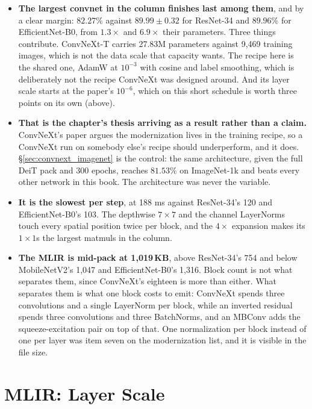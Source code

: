 \begin{itemize}
  \item \textbf{The largest convnet in the column finishes last among
    them}, and by a clear margin: $82.27\%$ against $89.99 \pm 0.32$ for
    ResNet-34 and $89.96\%$ for EfficientNet-B0, from $1.3\times$ and
    $6.9\times$ their parameters. Three things contribute. ConvNeXt-T
    carries 27.83M parameters against 9,469 training images, which is not
    the data scale that capacity wants. The recipe here is the shared one,
    AdamW at $10^{-3}$ with cosine and label smoothing, which is
    deliberately not the recipe ConvNeXt was designed around. And
    its layer scale starts at the paper's $10^{-6}$, which on this short
    schedule is worth three points on its own (above).
  \item \textbf{That is the chapter's thesis arriving as a result rather
    than a claim.} ConvNeXt's paper argues the modernization lives in the
    training recipe, so a ConvNeXt run on somebody else's recipe should
    underperform, and it does. \S\ref{sec:convnext_imagenet} is the
    control: the same architecture, given the full DeiT pack and 300
    epochs, reaches $81.53\%$ on ImageNet-1k and beats every other
    network in this book. The architecture was never the variable.
  \item \textbf{It is the slowest per step}, at 188 ms against
    ResNet-34's 120 and EfficientNet-B0's 103. The depthwise $7 \times 7$
    and the channel LayerNorms touch every spatial position twice per
    block, and the $4\times$ expansion makes its $1 \times 1$s the largest
    matmuls in the column.
  \item \textbf{The MLIR is mid-pack at 1{,}019\,KB}, above ResNet-34's 754
    and below MobileNetV2's 1,047 and EfficientNet-B0's 1,316. Block
    count is not what separates them, since ConvNeXt's eighteen is more
    than either. What separates them is what one block costs to emit:
    ConvNeXt spends three convolutions and a single LayerNorm per block,
    while an inverted residual spends three convolutions and three
    BatchNorms, and an MBConv adds the squeeze-excitation pair on top of
    that. One normalization per block instead of one per layer was item
    seven on the modernization list, and it is visible in the file size.
\end{itemize}

\section{MLIR: Layer Scale}

